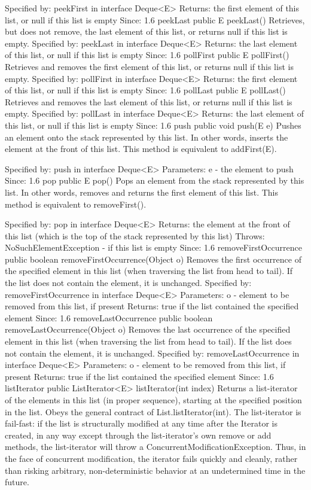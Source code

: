 \documentclass{book}
\begin{document}
Specified by:
peekFirst in interface Deque<E>
Returns:
the first element of this list, or null if this list is empty
Since:
1.6
peekLast
public E peekLast()
Retrieves, but does not remove, the last element of this list, or returns null if this list is empty.
Specified by:
peekLast in interface Deque<E>
Returns:
the last element of this list, or null if this list is empty
Since:
1.6
pollFirst
public E pollFirst()
Retrieves and removes the first element of this list, or returns null if this list is empty.
Specified by:
pollFirst in interface Deque<E>
Returns:
the first element of this list, or null if this list is empty
Since:
1.6
pollLast
public E pollLast()
Retrieves and removes the last element of this list, or returns null if this list is empty.
Specified by:
pollLast in interface Deque<E>
Returns:
the last element of this list, or null if this list is empty
Since:
1.6
push
public void push(E e)
Pushes an element onto the stack represented by this list. In other words, inserts the element at the front of this list.
This method is equivalent to addFirst(E).

Specified by:
push in interface Deque<E>
Parameters:
e - the element to push
Since:
1.6
pop
public E pop()
Pops an element from the stack represented by this list. In other words, removes and returns the first element of this list.
This method is equivalent to removeFirst().

Specified by:
pop in interface Deque<E>
Returns:
the element at the front of this list (which is the top of the stack represented by this list)
Throws:
NoSuchElementException - if this list is empty
Since:
1.6
removeFirstOccurrence
public boolean removeFirstOccurrence(Object o)
Removes the first occurrence of the specified element in this list (when traversing the list from head to tail). If the list does not contain the element, it is unchanged.
Specified by:
removeFirstOccurrence in interface Deque<E>
Parameters:
o - element to be removed from this list, if present
Returns:
true if the list contained the specified element
Since:
1.6
removeLastOccurrence
public boolean removeLastOccurrence(Object o)
Removes the last occurrence of the specified element in this list (when traversing the list from head to tail). If the list does not contain the element, it is unchanged.
Specified by:
removeLastOccurrence in interface Deque<E>
Parameters:
o - element to be removed from this list, if present
Returns:
true if the list contained the specified element
Since:
1.6
listIterator
public ListIterator<E> listIterator(int index)
Returns a list-iterator of the elements in this list (in proper sequence), starting at the specified position in the list. Obeys the general contract of List.listIterator(int).
The list-iterator is fail-fast: if the list is structurally modified at any time after the Iterator is created, in any way except through the list-iterator's own remove or add methods, the list-iterator will throw a ConcurrentModificationException. Thus, in the face of concurrent modification, the iterator fails quickly and cleanly, rather than risking arbitrary, non-deterministic behavior at an undetermined time in the future.
\end{document}
